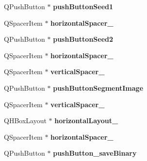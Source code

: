 \begin{DoxyCompactItemize}
\item 
\hypertarget{classUi__MainWindow_a859ef6b7ed20c5dc3062f06678ef1e4c}{Q\-Push\-Button $\ast$ {\bfseries push\-Button\-Seed1}}\label{classUi__MainWindow_a859ef6b7ed20c5dc3062f06678ef1e4c}

\item 
\hypertarget{classUi__MainWindow_ae2007c6e48638f819d3ac57be8daa4ca}{Q\-Spacer\-Item $\ast$ {\bfseries horizontal\-Spacer\-\_}}\label{classUi__MainWindow_ae2007c6e48638f819d3ac57be8daa4ca}

\item 
\hypertarget{classUi__MainWindow_a29ed28369fd46c711fea8c856f91577b}{Q\-Push\-Button $\ast$ {\bfseries push\-Button\-Seed2}}\label{classUi__MainWindow_a29ed28369fd46c711fea8c856f91577b}

\item 
\hypertarget{classUi__MainWindow_a3202b80ffde7629da626c1e0994f63f5}{Q\-Spacer\-Item $\ast$ {\bfseries horizontal\-Spacer\-\_}}\label{classUi__MainWindow_a3202b80ffde7629da626c1e0994f63f5}

\item 
\hypertarget{classUi__MainWindow_a298e82ba0cc2500cd61f393f493e4529}{Q\-Spacer\-Item $\ast$ {\bfseries vertical\-Spacer\-\_}}\label{classUi__MainWindow_a298e82ba0cc2500cd61f393f493e4529}

\item 
\hypertarget{classUi__MainWindow_abe535d626fd6aacbda232a4b72c8c8ae}{Q\-Push\-Button $\ast$ {\bfseries push\-Button\-Segment\-Image}}\label{classUi__MainWindow_abe535d626fd6aacbda232a4b72c8c8ae}

\item 
\hypertarget{classUi__MainWindow_a9d4bfb2fa0d87ccf9f7a311116676be6}{Q\-Spacer\-Item $\ast$ {\bfseries vertical\-Spacer\-\_}}\label{classUi__MainWindow_a9d4bfb2fa0d87ccf9f7a311116676be6}

\item 
\hypertarget{classUi__MainWindow_a80867018070156432923d0266cc9fe25}{Q\-H\-Box\-Layout $\ast$ {\bfseries horizontal\-Layout\-\_}}\label{classUi__MainWindow_a80867018070156432923d0266cc9fe25}

\item 
\hypertarget{classUi__MainWindow_acdff0826006698f82a7ef284f2950409}{Q\-Spacer\-Item $\ast$ {\bfseries horizontal\-Spacer\-\_}}\label{classUi__MainWindow_acdff0826006698f82a7ef284f2950409}

\item 
\hypertarget{classUi__MainWindow_afca82fb141fba22818217db0e6bdd1df}{Q\-Push\-Button $\ast$ {\bfseries push\-Button\-\_\-save\-Binary}}\label{classUi__MainWindow_afca82fb141fba22818217db0e6bdd1df}


\end{DoxyCompactItemize}

